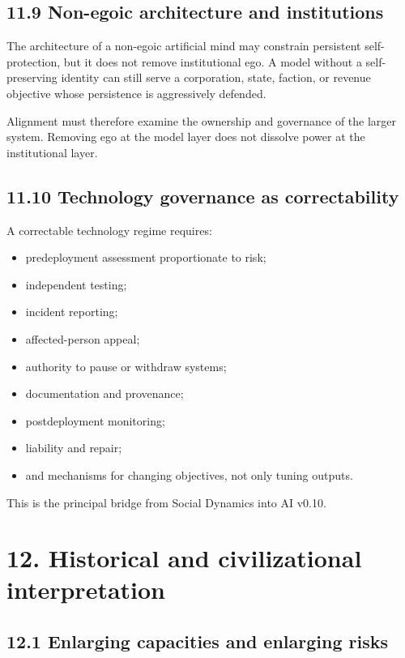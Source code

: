 \documentclass[
  11pt,
]{article}
\providecommand{\tightlist}{%
  \setlength{\itemsep}{0pt}\setlength{\parskip}{0pt}}
\begin{document}
\subsection{11.9 Non-egoic architecture and
institutions}\label{non-egoic-architecture-and-institutions}

The architecture of a non-egoic artificial mind may constrain persistent
self-protection, but it does not remove institutional ego. A model
without a self-preserving identity can still serve a corporation, state,
faction, or revenue objective whose persistence is aggressively
defended.

Alignment must therefore examine the ownership and governance of the
larger system. Removing ego at the model layer does not dissolve power
at the institutional layer.

\subsection{11.10 Technology governance as
correctability}\label{technology-governance-as-correctability}

A correctable technology regime requires:

\begin{itemize}
\tightlist
\item
  predeployment assessment proportionate to risk;
\item
  independent testing;
\item
  incident reporting;
\item
  affected-person appeal;
\item
  authority to pause or withdraw systems;
\item
  documentation and provenance;
\item
  postdeployment monitoring;
\item
  liability and repair;
\item
  and mechanisms for changing objectives, not only tuning outputs.
\end{itemize}

This is the principal bridge from Social Dynamics into AI v0.10.

\section{12. Historical and civilizational
interpretation}\label{historical-and-civilizational-interpretation}

\subsection{12.1 Enlarging capacities and enlarging
risks}\label{enlarging-capacities-and-enlarging-risks}
\end{document}
